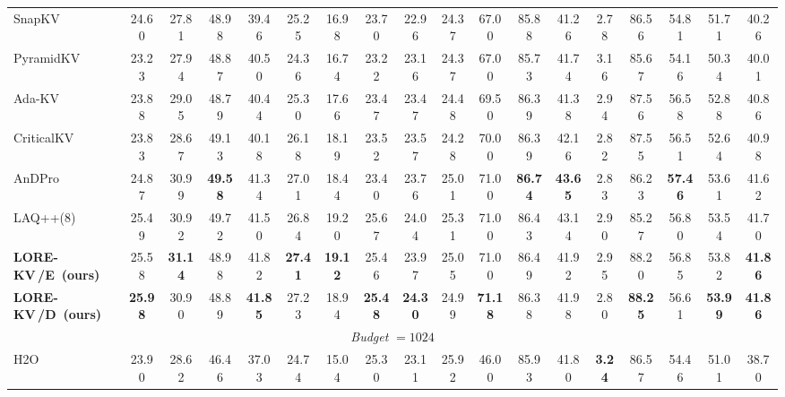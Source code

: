 \documentclass{article} %
\newcommand{\best}[1]{\textcolor{bestblue}{\textbf{#1}}}
\newcommand{\second}[1]{\textcolor{secondorange}{#1}}
\newcommand{\lorekvE}{LORE-KV\,/E}
\newcommand{\lorekvD}{LORE-KV\,/D}
\begin{document}
\begin{table}[t]
{\begin{tabular}{lccccccccccccccccc}
SnapKV 
& 24.60 & 27.81 & 48.98 
& 39.46 & 25.25 & 16.98 
& 23.70 & 22.96 & 24.37 
& 67.00 & 85.88 & 41.26 
& 2.78 & 86.56 
& 54.81 & 51.71 
& 40.26 \\

PyramidKV 
& 23.23 & 27.94 & 48.87 
& 40.50 & 24.36 & 16.74 
& 23.22 & 23.16 & 24.37 
& 67.00 & 85.73 & 41.74 
& \second{3.16} & 85.67 
& 54.16 & 50.34 
& 40.01 \\

Ada-KV 
& 23.88 & 29.05 & 48.79 
& 40.44 & 25.30 & 17.66 
& 23.47 & 23.47 & 24.48 
& 69.50 & 86.39 & 41.38 
& 2.94 & 87.56 
& 56.58 & 52.88 
& 40.86 \\

CriticalKV 
& 23.83 & 28.67 & \second{49.13} 
& 40.18 & 26.18 & 18.19 
& 23.52 & 23.57 & 24.28 
& 70.00 & 86.39 & \second{42.16} 
& 2.82 & 87.55 
& 56.51 & 52.64 
& 40.98 \\

AnDPro 
& 24.87 & \second{30.99} & \best{49.58} 
& 41.34 & 27.01 & 18.44 
& 23.40 & 23.76 & 25.01 
& \second{71.00} & \best{86.74} & \best{43.65} 
& 2.83 & 86.23 
& \best{57.46} & 53.61 
& \second{41.62} \\

LAQ++(8)
& 25.49 & 30.92 & 49.72 
& 41.50 & 26.84 & 19.20 
& 25.67 & 24.04 & 25.31 
& 71.00 & 86.43 & 43.14 
& 2.90 & 85.27 
& 56.80 & 53.54 
& 41.70 \\

\textbf{\lorekvE\ (ours)} 
& \second{25.58} & \best{31.14} & 48.98 
& \second{41.82} & \best{27.41} & \best{19.12} 
& \second{25.46} & \second{23.97} & \second{25.05} 
& \second{71.00} & \second{86.49} & 41.92 
& 2.95 & \second{88.20} 
& \second{56.85} & \second{53.82} 
& \best{41.86} \\

\textbf{\lorekvD\ (ours)} 
& \best{25.98} & 30.90 & 48.89 
& \best{41.85} & \second{27.23} & \second{18.94} 
& \best{25.48} & \best{24.30} & 24.99 
& \best{71.18} & 86.38 & 41.98 
& 2.80 & \best{88.25} 
& 56.61 & \best{53.99} 
& \best{41.86} \\

\midrule
\multicolumn{18}{c}{\textit{Budget} $=1024$} \\
\midrule

H2O 
& 23.90 & 28.62 & 46.46 
& 37.03 & 24.74 & 15.04 
& 25.30 & 23.11 & 25.92 
& 46.00 & 85.93 & 41.80 
& \best{3.24} & 86.57 
& 54.46 & 51.01 
& 38.70 \\


\end{tabular}}
\end{table}
\end{document}
